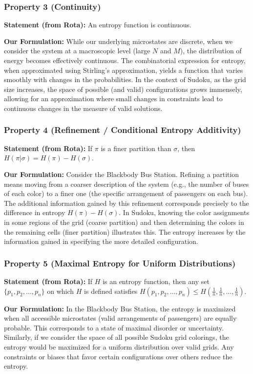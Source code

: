 \documentclass{report}
\begin{document}
\subsubsection*{Property 3 (Continuity)}
\textbf{Statement (from Rota):} An entropy function is continuous.

\textbf{Our Formulation:} While our underlying microstates are discrete, when we consider the system at a macroscopic level (large \(N\) and \(M\)), the distribution of energy becomes effectively continuous. The combinatorial expression for entropy, when approximated using Stirling's approximation, yields a function that varies smoothly with changes in the probabilities. In the context of Sudoku, as the grid size increases, the space of possible (and valid) configurations grows immensely, allowing for an approximation where small changes in constraints lead to continuous changes in the measure of valid solutions.

\subsubsection*{Property 4 (Refinement / Conditional Entropy Additivity)}
\textbf{Statement (from Rota):} If \( \pi \) is a finer partition than \( \sigma \), then \( H(\pi|\sigma) = H(\pi) - H(\sigma) \).

\textbf{Our Formulation:} Consider the Blackbody Bus Station. Refining a partition means moving from a coarser description of the system (e.g., the number of buses of each color) to a finer one (the specific arrangement of passengers on each bus). The additional information gained by this refinement corresponds precisely to the difference in entropy \( H(\pi) - H(\sigma) \). In Sudoku, knowing the color assignments in some regions of the grid (coarse partition) and then determining the colors in the remaining cells (finer partition) illustrates this. The entropy increases by the information gained in specifying the more detailed configuration.

\subsubsection*{Property 5 (Maximal Entropy for Uniform Distributions)}
\textbf{Statement (from Rota):} If \( H \) is an entropy function, then any set \( \{p_1, p_2, \ldots, p_n\} \) on which \( H \) is defined satisfies \( H(p_1, p_2, \ldots, p_n) \leq H\left(\frac{1}{n}, \frac{1}{n}, \ldots, \frac{1}{n}\right) \).

\textbf{Our Formulation:} In the Blackbody Bus Station, the entropy is maximized when all accessible microstates (valid arrangements of passengers) are equally probable. This corresponds to a state of maximal disorder or uncertainty. Similarly, if we consider the space of all possible Sudoku grid colorings, the entropy would be maximized for a uniform distribution over valid grids. Any constraints or biases that favor certain configurations over others reduce the entropy.
\end{document}
